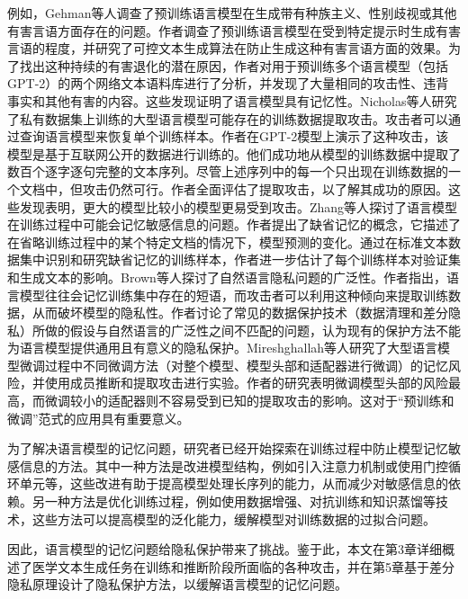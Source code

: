 例如，Gehman等人\cite{RealToxicityPrompts}调查了预训练语言模型在生成带有种族主义、性别歧视或其他有害言语方面存在的问题。作者调查了预训练语言模型在受到特定提示时生成有害言语的程度，并研究了可控文本生成算法在防止生成这种有害言语方面的效果。为了找出这种持续的有害退化的潜在原因，作者对用于预训练多个语言模型（包括GPT-2）的两个网络文本语料库进行了分析，并发现了大量相同的攻击性、违背事实和其他有害的内容。这些发现证明了语言模型具有记忆性。Nicholas等人\cite{Extrac_Train_Data_From_LM}研究了私有数据集上训练的大型语言模型可能存在的训练数据提取攻击。攻击者可以通过查询语言模型来恢复单个训练样本。作者在GPT-2模型上演示了这种攻击，该模型是基于互联网公开的数据进行训练的。他们成功地从模型的训练数据中提取了数百个逐字逐句完整的文本序列。尽管上述序列中的每一个只出现在训练数据的一个文档中，但攻击仍然可行。作者全面评估了提取攻击，以了解其成功的原因。这些发现表明，更大的模型比较小的模型更易受到攻击。Zhang等人\cite{Counterfactual}探讨了语言模型在训练过程中可能会记忆敏感信息的问题。作者提出了缺省记忆的概念，它描述了在省略训练过程中的某个特定文档的情况下，模型预测的变化。通过在标准文本数据集中识别和研究缺省记忆的训练样本，作者进一步估计了每个训练样本对验证集和生成文本的影响。Brown等人\cite{LMPPMean}探讨了自然语言隐私问题的广泛性。作者指出，语言模型往往会记忆训练集中存在的短语，而攻击者可以利用这种倾向来提取训练数据，从而破坏模型的隐私性。作者讨论了常见的数据保护技术（数据清理和差分隐私）所做的假设与自然语言的广泛性之间不匹配的问题，认为现有的保护方法不能为语言模型提供通用且有意义的隐私保护。Mireshghallah等人\cite{mireshghallah2022memorization}研究了大型语言模型微调过程中不同微调方法（对整个模型、模型头部和适配器进行微调）的记忆风险，并使用成员推断和提取攻击进行实验。作者的研究表明微调模型头部的风险最高，而微调较小的适配器则不容易受到已知的提取攻击的影响。这对于“预训练和微调”范式的应用具有重要意义。

为了解决语言模型的记忆问题，研究者已经开始探索在训练过程中防止模型记忆敏感信息的方法。其中一种方法是改进模型结构，例如引入注意力机制或使用门控循环单元等，这些改进有助于提高模型处理长序列的能力，从而减少对敏感信息的依赖。另一种方法是优化训练过程，例如使用数据增强、对抗训练和知识蒸馏等技术，这些方法可以提高模型的泛化能力，缓解模型对训练数据的过拟合问题。


因此，语言模型的记忆问题给隐私保护带来了挑战。鉴于此，本文在第3章详细概述了医学文本生成任务在训练和推断阶段所面临的各种攻击，并在第5章基于差分隐私原理设计了隐私保护方法，以缓解语言模型的记忆问题。

